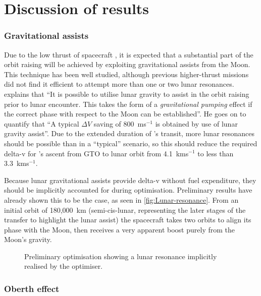 \chapter{Discussion of results} \label{cha:Discussion-of-results}

\subsection{Gravitational assists}

Due to the low thrust of spacecraft \BW, it is expected that a substantial part of the orbit raising will be achieved by exploiting gravitational assists from the Moon. This technique has been well studied, although previous higher-thrust missions did not find it efficient to attempt more than one or two lunar resonances. \textcite{Kemble2006} explains that \enquote{It is possible to utilise lunar gravity to assist in the orbit raising prior to lunar encounter. This takes the form of a \emph{gravitational pumping} effect if the correct phase with respect to the Moon can be established}. He goes on to quantify that \enquote{A typical $\Delta V$ saving of 800~ms$^{-1}$ is obtained by use of lunar gravity assist}. Due to the extended duration of \BW's transit, more lunar resonances should be possible than in a \enquote{typical} scenario, so this should reduce the required delta-v for \BW's ascent from GTO to lunar orbit from 4.1~kms$^{-1}$ to less than 3.3~kms$^{-1}$.

Because lunar gravitational assists provide delta-v without fuel expenditure, they should be implicitly accounted for during optimisation. Preliminary results have already shown this to be the case, as seen in \autoref{fig:Lunar-resonance}. From an initial orbit of 180,000~km (semi-cis-lunar, representing the later stages of the transfer to highlight the lunar assist) the spacecraft takes two orbits to align its phase with the Moon, then receives a very apparent boost purely from the Moon's gravity.

\begin{figure}
\centering
\caption{Preliminary optimisation showing a lunar resonance implicitly realised by the optimiser.}
\label{fig:Lunar-resonance}
\end{figure}

\subsection{Oberth effect}


